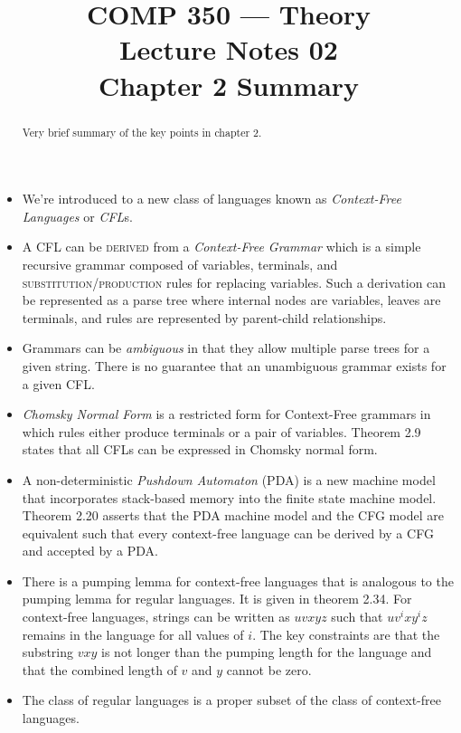 \documentclass[nobib]{tufte-handout}
\title{COMP 350 --- Theory \\ Lecture Notes 02 \\ Chapter 2 Summary}
\begin{document}
\maketitle

\begin{abstract}
Very brief summary of the key points in chapter 2.
\end{abstract}

\begin{itemize}
  \item We're introduced to a new class of languages known as \textit{Context-Free Languages} or \textit{CFL}s.

  \item A CFL can be \textsc{derived} from a \textit{Context-Free Grammar} which is a simple recursive grammar composed of variables, terminals, and \textsc{substitution}/\textsc{production} rules for replacing variables.  Such a derivation can be represented as a parse tree where internal nodes are variables, leaves are terminals, and rules are represented by parent-child relationships.

  \item Grammars can be \textit{ambiguous} in that they allow multiple parse trees for a given string. There is no guarantee that an unambiguous grammar exists for a given CFL\@.

  \item \textit{Chomsky Normal Form} is a restricted form for Context-Free grammars in which rules either produce terminals or a pair of variables.  Theorem 2.9 states that all CFLs can be expressed in Chomsky normal form.

  \item A non-deterministic \textit{Pushdown Automaton} (PDA) is a new machine model that incorporates stack-based memory into the finite state machine model. Theorem 2.20 asserts that the PDA machine model and the CFG model are equivalent such that every context-free language can be derived by a CFG and accepted by a PDA\@.

  \item There is a pumping lemma for context-free languages that is analogous to the pumping lemma for regular languages. It is given in theorem 2.34.  For context-free languages, strings can be written as $uvxyz$ such that $uv^{i}xy^{i}z$ remains in the language for all values of $i$. The key constraints are that the substring $vxy$ is not longer than the pumping length for the language and that the combined length of $v$ and $y$ cannot be zero.

  \item The class of regular languages is a proper subset of the class of context-free languages.

\end{itemize}
\end{document}

